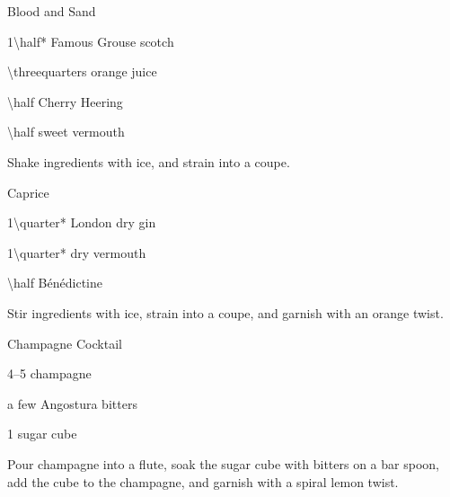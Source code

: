 \begin{PDTCocktail}{Blood and Sand}
	\begin{Ingredients}
	\item \SI{1\half*}{\oz} Famous Grouse scotch
	\item \SI{\threequarters}{\oz} orange juice
	\item \SI{\half}{\oz} Cherry Heering
	\item \SI{\half}{\oz} sweet vermouth
	\end{Ingredients}
	
	\begin{Instructions}
	Shake ingredients with ice, and strain into a coupe.
	\end{Instructions}
\end{PDTCocktail}

\begin{PDTCocktail}{Caprice}
	\begin{Ingredients}
	\item \SI{1\quarter*}{\oz} London dry gin
	\item \SI{1\quarter*}{\oz} dry vermouth
	\item \SI{\half}{\oz} B\'en\'edictine
	\end{Ingredients}
	
	\begin{Instructions}
	Stir ingredients with ice, strain into a coupe, and garnish with an orange twist.
	\end{Instructions}
\end{PDTCocktail}

\begin{PDTCocktail}{Champagne Cocktail}
	\begin{Ingredients}
	\item \SIrange{4}{5}{\oz} champagne
	\item a few \si{\dashes} Angostura bitters
	\item 1 sugar cube
	\end{Ingredients}
	
	\begin{Instructions}
	Pour champagne into a flute, soak the sugar cube with bitters on a bar spoon, add the cube to the champagne, and garnish with a spiral lemon twist.
	\end{Instructions}
\end{PDTCocktail}

